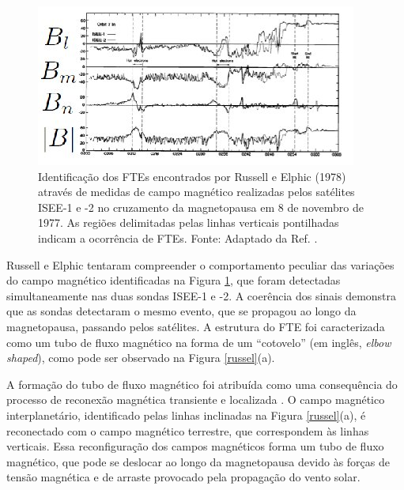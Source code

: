 \begin{figure}
	\begin{center}
		\includegraphics[scale=0.9,angle=90]{bipolar.jpg}
		\caption{Identificação dos FTEs encontrados por Russell e Elphic (1978) através de medidas de campo magnético realizadas pelos satélites ISEE-1 e -2 no cruzamento da magnetopausa em 8 de novembro de 1977. As regiões delimitadas pelas linhas verticais pontilhadas indicam a ocorrência de FTEs. Fonte: Adaptado da Ref. \cite{elphic1978}.  }
		\label{bipolar}
	\end{center}
\end{figure}

Russell e Elphic tentaram compreender o comportamento peculiar das variações do campo magnético identificadas na Figura \ref{bipolar}, que foram detectadas simultaneamente nas duas sondas ISEE-1 e -2. A coerência dos sinais demonstra que as sondas detectaram o mesmo evento, que se propagou ao longo da magnetopausa, passando pelos satélites. A estrutura do FTE foi caracterizada como um tubo de fluxo magnético na forma de um ``cotovelo'' (em inglês, \textit{elbow shaped}), como pode ser observado na Figura \ref{russel}(a). 

A formação do tubo de fluxo magnético foi atribuída como uma consequência do processo de reconexão magnética transiente e localizada \cite{elphic1978}.  O campo magnético interplanetário, identificado pelas linhas inclinadas na Figura \ref{russel}(a), é reconectado com o campo magnético terrestre, que correspondem às linhas verticais. Essa reconfiguração dos campos magnéticos forma um tubo de fluxo magnético, que pode se deslocar ao longo da magnetopausa devido às forças de tensão magnética e de arraste provocado pela propagação do vento solar.


